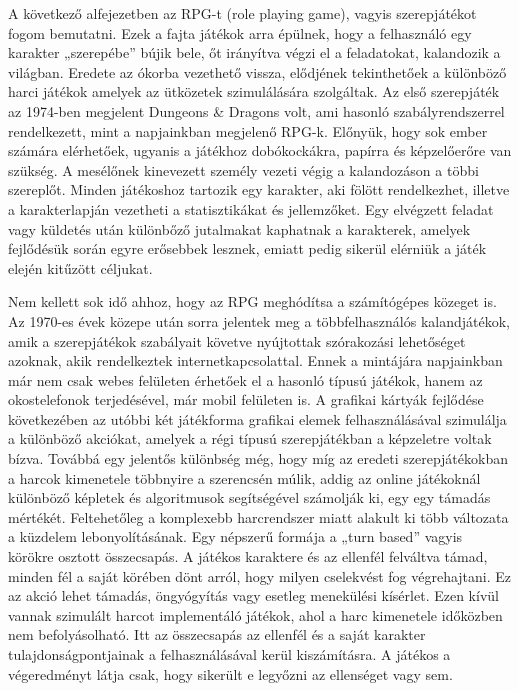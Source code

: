 A következő alfejezetben az RPG-t (role playing game), vagyis szerepjátékot fogom bemutatni. 
Ezek a fajta játékok arra épülnek, hogy a felhasználó egy karakter „szerepébe” bújik bele, őt irányítva végzi el a feladatokat, kalandozik a világban. 
Eredete az ókorba vezethető vissza, elődjének tekinthetőek a különböző harci játékok amelyek az ütközetek szimulálására szolgáltak. 
Az első szerepjáték az 1974-ben megjelent Dungeons \& Dragons volt, ami hasonló szabályrendszerrel rendelkezett, mint a napjainkban megjelenő RPG-k. 
Előnyük, hogy sok ember számára elérhetőek, ugyanis a játékhoz dobókockákra, papírra és képzelőerőre van szükség. 
A mesélőnek kinevezett személy vezeti végig a kalandozáson a többi szereplőt. 
Minden játékoshoz tartozik egy karakter, aki fölött rendelkezhet, illetve a karakterlapján vezetheti a statisztikákat és jellemzőket. 
Egy elvégzett feladat vagy küldetés után különbőző jutalmakat kaphatnak a karakterek, amelyek fejlődésük során egyre erősebbek lesznek, emiatt pedig sikerül elérniük a játék elején kitűzött céljukat. 

Nem kellett sok idő ahhoz, hogy az RPG meghódítsa a számítógépes közeget is. 
Az 1970-es évek közepe után sorra jelentek meg a többfelhasználós kalandjátékok, amik a szerepjátékok szabályait követve nyújtottak szórakozási lehetőséget azoknak, akik rendelkeztek internetkapcsolattal. 
Ennek a mintájára napjainkban már nem csak webes felületen érhetőek el a hasonló típusú játékok, hanem az okostelefonok terjedésével, már mobil felületen is. 
A grafikai kártyák fejlődése következében az utóbbi két játékforma grafikai elemek felhasználásával szimulálja a különböző akciókat, amelyek a régi típusú szerepjátékban a képzeletre voltak bízva. 
Továbbá egy jelentős különbség még, hogy míg az eredeti szerepjátékokban a harcok kimenetele többnyire a szerencsén múlik, addig az online játékoknál különböző képletek és algoritmusok segítségével számolják ki, egy egy támadás mértékét. 
Feltehetőleg a komplexebb harcrendszer miatt alakult ki több változata a küzdelem lebonyolításának. 
Egy népszerű formája a „turn based” vagyis körökre osztott összecsapás. 
A játékos karaktere és az ellenfél felváltva támad, minden fél a saját körében dönt arról, hogy milyen cselekvést fog végrehajtani. 
Ez az akció lehet támadás, öngyógyítás vagy esetleg menekülési kísérlet. 
Ezen kívül vannak szimulált harcot implementáló játékok, ahol a harc kimenetele időközben nem befolyásolható.
Itt az összecsapás az ellenfél és a saját karakter tulajdonságpontjainak a felhasználásával kerül kiszámításra. 
A játékos a végeredményt látja csak, hogy sikerült e legyőzni az ellenséget vagy sem. 

